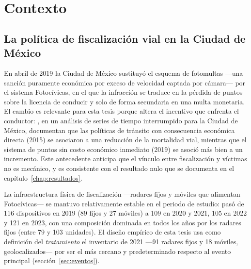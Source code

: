 \chapter{Contexto}
\label{sec:contexto}

\section{La política de fiscalización vial en la Ciudad de México}
\label{sec:contexto_politica}

En abril de 2019 la Ciudad de México sustituyó el esquema de fotomultas —una
sanción puramente económica por exceso de velocidad captada por cámara— por el
sistema Fotocívicas, en el que la infracción se traduce en la pérdida de
puntos sobre la licencia de conducir y solo de forma secundaria en una multa
monetaria. El cambio es relevante para esta tesis porque altera el incentivo
que enfrenta el conductor: \citet{quintero2023}, en un análisis de series de
tiempo interrumpido para la Ciudad de México, documentan que las políticas de
tránsito con consecuencia económica directa (2015) se asociaron a una
reducción de la mortalidad vial, mientras que el sistema de puntos sin costo
económico inmediato (2019) se asoció más bien a un incremento. Este
antecedente anticipa que el vínculo entre fiscalización y víctimas no es
mecánico, y es consistente con el resultado nulo que se documenta en el
capítulo~\ref{chap:resultados}.

La infraestructura física de fiscalización —radares fijos y móviles que
alimentan Fotocívicas— se mantuvo relativamente estable en el periodo de
estudio: pasó de 116 dispositivos en 2019 (89 fijos y 27 móviles) a 109 en
2020 y 2021, 105 en 2022 y 121 en 2023, con una composición dominada en todos
los años por los radares fijos (entre 79 y 103 unidades). El diseño empírico
de esta tesis usa como definición del \emph{tratamiento} el inventario de
2021 —91 radares fijos y 18 móviles, geolocalizados— por ser el más cercano y
predeterminado respecto al evento principal (sección~\ref{sec:eventos}).

